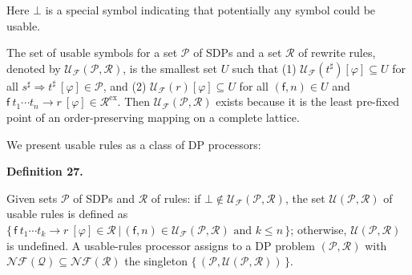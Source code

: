 \documentclass[10pt,a4paper]{amsart}
\begin{document}
 
  
Here $\bot$ is a special symbol indicating that potentially any symbol could be usable.\par
 
 
 
The set of usable symbols for a set $\mathcal{P}$ of SDPs and a set $\mathcal{R}$ of rewrite rules, denoted by $\mathcal{U}_{\mathcal{F}}(\mathcal{P},\mathcal{R})$, is the smallest set $U$ such that (1) $\mathcal{U}_{\mathcal{F}}(t^{\sharp})[\varphi]\subseteq U$ for all ${s^{\sharp}}\Rightarrow{t^{\sharp}}\ [\varphi]\in\mathcal{P}$, and (2) $\mathcal{U}_{\mathcal{F}}(r)[\varphi]\subseteq U$ for all $(\mathsf{f},n)\in U$ and ${{\mathsf{f}}\ {{t}_{1}\cdots{t}_{n}}}\rightarrow{r}\ [\varphi]\in\mathcal{R}^{\mathrm{ex}}$. Then $\mathcal{U}_{\mathcal{F}}(\mathcal{P},\mathcal{R})$ exists because it is the least pre-fixed point of an order-preserving mapping on a complete lattice.\par
 
 
 
 
We present usable rules as a class of DP processors:\par
 
 
 
\par\medskip\noindent\textbf{Definition 27.}\par
 
 
Given sets $\mathcal{P}$ of SDPs and $\mathcal{R}$ of rules: if $\bot\notin\mathcal{U}_{\mathcal{F}}(\mathcal{P},\mathcal{R})$, the set $\mathcal{U}(\mathcal{P},\mathcal{R})$ of usable rules is defined as $\{\,{{\mathsf{f}}\ {{t}_{1}\cdots{t}_{k}}}\rightarrow{r}\ [\varphi]\in\mathcal{R}\,|\,(\mathsf{f},n)\in\mathcal{U}_{\mathcal{F}}(\mathcal{P},\mathcal{R})\text{ and }k\leq n\,\}$; otherwise, $\mathcal{U}(\mathcal{P},\mathcal{R})$ is undefined. A usable-rules processor assigns to a DP problem $(\mathcal{P},\mathcal{R})$ with $\mathcal{N}\!\mathcal{F}(\mathcal{Q})\subseteq\mathcal{N}\!\mathcal{F}(\mathcal{R})$ the singleton $\{\,(\mathcal{P},\mathcal{U}(\mathcal{P},\mathcal{R}))\,\}$.\par
 
 
\end{document}

